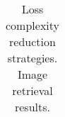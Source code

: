 \begin{table}
\begin{tabular}{lllll}


\bottomrule

\end{tabular}
\caption{Loss complexity reduction strategies. Image retrieval results.}
\label{table:complexity_opts_img_ret_decomp}
\end{table}
